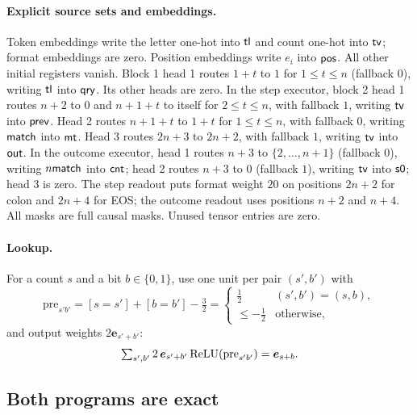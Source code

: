 \paragraph{Explicit source sets and embeddings.}
Token embeddings write the letter one-hot into $\mathsf{tl}$ and count one-hot into $\mathsf{tv}$; format embeddings are zero. Position embeddings write $e_i$ into $\mathsf{pos}$. All other initial registers vanish. Block 1 head 1 routes $1+t$ to $1$ for $1\le t\le n$ (fallback $0$), writing $\mathsf{tl}$ into $\mathsf{qry}$. Its other heads are zero. In the step executor, block 2 head 1 routes $n+2$ to $0$ and $n+1+t$ to itself for $2\le t\le n$, with fallback $1$, writing $\mathsf{tv}$ into $\mathsf{prev}$. Head 2 routes $n+1+t$ to $1+t$ for $1\le t\le n$, with fallback $0$, writing $\mathsf{match}$ into $\mathsf{mt}$. Head 3 routes $2n+3$ to $2n+2$, with fallback $1$, writing $\mathsf{tv}$ into $\mathsf{out}$. In the outcome executor, head 1 routes $n+3$ to $\{2,\ldots,n+1\}$ (fallback $0$), writing $n\mathsf{match}$ into $\mathsf{cnt}$; head 2 routes $n+3$ to $0$ (fallback $1$), writing $\mathsf{tv}$ into $\mathsf{s0}$; head 3 is zero. The step readout puts format weight $20$ on positions $2n+2$ for colon and $2n+4$ for EOS; the outcome readout uses positions $n+2$ and $n+4$. All masks are full causal masks. Unused tensor entries are zero.

\paragraph{Lookup.} For a count $s$ and a bit $b\in\{0,1\}$, use one unit per pair $(s',b')$ with
\[
 \mathrm{pre}_{s'b'}=[s=s']+[b=b']-\tfrac{3}{2}=\begin{cases}\tfrac{1}{2}&(s',b')=(s,b),\\\le-\tfrac{1}{2}&\text{otherwise},\end{cases}
\]
and output weights $2\bm e_{s'+b'}$:
\begin{equation}
 \textstyle\sum_{s',b'}2\,\bm e_{s'+b'}\operatorname{ReLU}(\mathrm{pre}_{s'b'})=\bm e_{s+b}.
 \label{eq:lookup}
\end{equation}

\subsection{Both programs are exact}
\label{app:exact}

